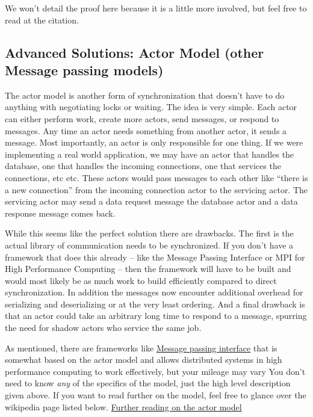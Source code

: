 We won't detail the proof here because it is a little more involved, but feel free to read at the citation.

\subsection{Advanced Solutions: Actor Model (other Message passing models)}

The actor model is another form of synchronization that doesn't have to do anything with negotiating locks or waiting.
The idea is very simple.
Each actor can either perform work, create more actors, send messages, or respond to messages.
Any time an actor needs something from another actor, it sends a message.
Most importantly, an actor is only responsible for one thing.
If we were implementing a real world application, we may have an actor that handles the database, one that handles the incoming connections, one that services the connections, etc etc.
These actors would pass messages to each other like ``there is a new connection'' from the incoming connection actor to the servicing actor.
The servicing actor may send a data request message the database actor and a data response message comes back.

While this seems like the perfect solution there are drawbacks.
The first is the actual library of communication needs to be synchronized.
If you don't have a framework that does this already -- like the Message Passing Interface or MPI for High Performance Computing -- then the framework will have to be built and would most likely be as much work to build efficiently compared to direct synchronization.
In addition the messages now encounter additional overhead for serializing and deserializing or at the very least ordering.
And a final drawback is that an actor could take an arbitrary long time to respond to a message, spurring the need for shadow actors who service the same job.

As mentioned, there are frameworks like \href{https://en.wikipedia.org/wiki/Message\_Passing\_Interface}{Message passing interface} that is somewhat based on the actor model and allows distributed systems in high performance computing to work effectively, but your mileage may vary
You don't need to know \textit{any} of the specifics of the model, just the high level description given above.
If you want to read further on the model, feel free to glance over the wikipedia page listed below.
\href{https://en.wikipedia.org/wiki/Actor\_model}{Further reading on the actor model}

